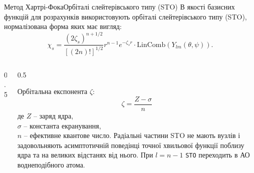 \documentclass[10pt]{beamer}
\begin{document}
\begin{frame}{Метод Хартрі-Фока}{Орбіталі слейтерівського типу (STO)}
	В якості базисних функцій для розрахунків використовують орбіталі слейтерівського типу  (STO), нормалізована форма яких має вигляд:
	\begin{equation*}
		\chi_s = \frac{(2\zeta_s)^{n + 1/2}}{[(2n)!]^{1/2}} r^{n - 1}e^{-\zeta_s r} \cdot \mathrm{LinComb}\left(Y_{lm}(\theta, \psi)\right).
	\end{equation*}
	{\scriptsize {}}
	\begin{columns}
		\begin{column}{0.5\linewidth}
			\begin{center}
			\end{center}
		\end{column}
		\begin{column}{0.5\linewidth}
			\begin{overprint}
				Орбітальна експонента $\zeta$:
				\[\zeta = \frac{Z-\sigma}{n}\]
				де
				$Z$ --  заряд ядра,\\
				$\sigma$ -- константа екранування,\\
				$n$ -- ефективне квантове число.
				\onslide<2>
				Радіальні частини STO не мають вузлів і задовольняють асимптотичній поведінці точної хвильової функції поблизу ядра та на великих відстанях від нього. При $l = n - 1$ \texttt{STO} переходить в АО воднеподібного атома.
			\end{overprint}
		\end{column}
	\end{columns}
\end{frame}
\end{document}

